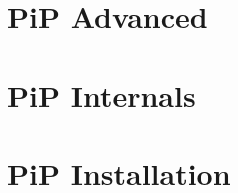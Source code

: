 \documentclass[a4paper,11pt,makeidx]{report} %
\begin{document}
\chapter{PiP Advanced}\label{chap:advanced}










\chapter{PiP Internals}



\chapter{PiP Installation}








\printindex
\end{document}
